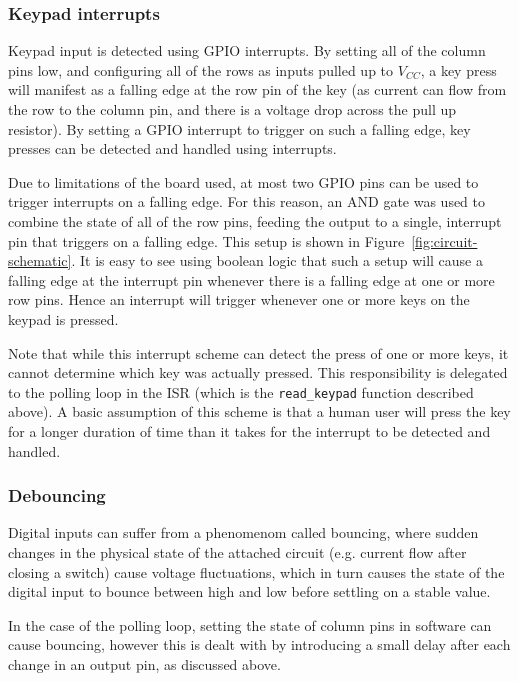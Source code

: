 \documentclass[11pt,a4paper,twocolumn]{scrartcl}
\begin{document}
\subsubsection{Keypad interrupts}

Keypad input is detected using GPIO interrupts. By setting all of the column pins low, and configuring all of the rows as inputs pulled up to $V_{CC}$, a key press will manifest as a falling edge at the row pin of the key (as current can flow from the row to the column pin, and there is a voltage drop across the pull up resistor). By setting a GPIO interrupt to trigger on such a falling edge, key presses can be detected and handled using interrupts.

Due to limitations of the board used, at most two GPIO pins can be used to trigger interrupts on a falling edge. For this reason, an AND gate was used to combine the state of all of the row pins, feeding the output to a single, interrupt pin that triggers on a falling edge. This setup is shown in Figure~\ref{fig:circuit-schematic}. It is easy to see using boolean logic that such a setup will cause a falling edge at the interrupt pin whenever there is a falling edge at one or more row pins. Hence an interrupt will trigger whenever one or more keys on the keypad is pressed.

Note that while this interrupt scheme can detect the press of one or more keys, it cannot determine which key was actually pressed. This responsibility is delegated to the polling loop in the ISR (which is the \verb!read_keypad! function described above). A basic assumption of this scheme is that a human user will press the key for a longer duration of time than it takes for the interrupt to be detected and handled.

\subsubsection{Debouncing}

Digital inputs can suffer from a phenomenom called bouncing, where sudden changes in the physical state of the attached circuit (e.g. current flow after closing a switch) cause voltage fluctuations, which in turn causes the state of the digital input to bounce between high and low before settling on a stable value. 

In the case of the polling loop, setting the state of column pins in software can cause bouncing, however this is dealt with by introducing a small delay after each change in an output pin, as discussed above.
\end{document}
